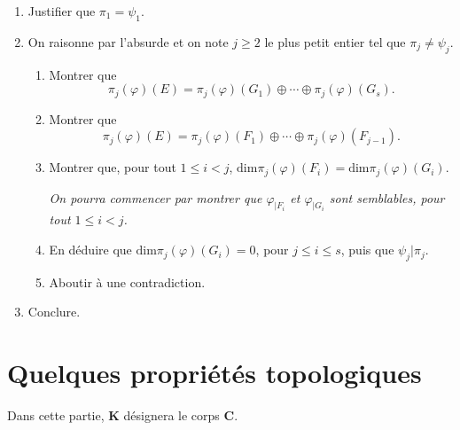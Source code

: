\documentclass[a4paper,11pt]{article}
\newcommand{\C}{\mathbf{C}}
\newcommand{\K}{\mathbf{K}}
\begin{document}
\begin{enumerate}
\begin{enumerate}
\item Justifier que $\pi_1=\psi_1$.
\item On raisonne par l'absurde et on note $j\geq 2$ le plus petit entier tel que $\pi_j\neq\psi_j$.
\begin{enumerate}
\item Montrer que 
\[\pi_j(\varphi)(E)=\pi_j(\varphi)(G_1)\oplus\cdots\oplus \pi_j(\varphi)(G_s).\]
\item Montrer que
\[\pi_j(\varphi)(E)=\pi_j(\varphi)(F_1)\oplus\cdots\oplus \pi_j(\varphi)(F_{j-1}).\]
\item Montrer que, pour tout $1\leq i<j$, $\mathrm{dim}\pi_j(\varphi)(F_i)=\mathrm{dim}\pi_j(\varphi)(G_i)$.

{\textit{\footnotesize On pourra commencer par montrer que $\varphi_{\vert F_i}$ et $\varphi_{\vert G_i}$ sont semblables, pour tout $1\leq i<j$.}}
\item En déduire que $\mathrm{dim}\pi_j(\varphi)(G_i)=0$, pour $j\leq i\leq s$, puis que $\psi_j\vert\pi_j$.
\item Aboutir à une contradiction.
\end{enumerate}
\item Conclure.
\end{enumerate}
\end{enumerate}
\section{Quelques propriétés topologiques}
Dans cette partie, $\K$ désignera le corps $\C$.
\end{document}
